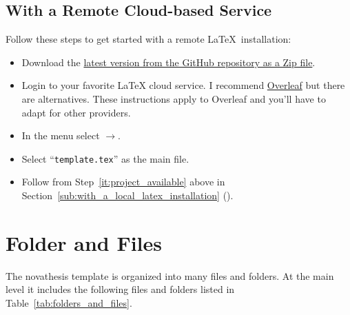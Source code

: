 
\subsection{With a Remote Cloud-based Service} %
\label{sub:with_a_remote_cloud_based_service}

Follow these steps to get started with a remote \LaTeX\ installation:

\begin{itemize}
  \item Download the \href{https://github.com/joaomlourenco/novathesis/archive/master.zip}{latest version from the GitHub repository as a Zip file}.
  \item Login to your favorite LaTeX cloud service. I recommend \href{https://www.overleaf.com/?r=f5160636&rm=d&rs=b}{Overleaf} but there are alternatives. These instructions apply to Overleaf and you'll have to adapt for other providers.
  \item In the menu select $\rightarrow$.
  \item Select “\verb!template.tex!” as the main file.
  \item Follow from Step~\ref{it:project_available} above in Section~\ref{sub:with_a_local_latex_installation} ().
\end{itemize}



\section{Folder and Files}
\label{sec:folders_and_files}

The \gls{novathesis} template is organized into many files and folders. At the main level it includes the following files and folders listed in Table~\ref{tab:folders_and_files}.

\newcommand{\accessAllowed}{\texttt{[image: access\_allowed]}}
\newcommand{\accessForbiden}{\texttt{[image: access\_forbidden]}}

